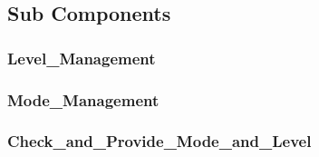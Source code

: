 \subsection{Sub Components}\label{s:mdoe_and_level_subcomponents}

\subsubsection{Level\_Management}


\subsubsection{Mode\_Management}


\subsubsection{Check\_and\_Provide\_Mode\_and\_Level}



